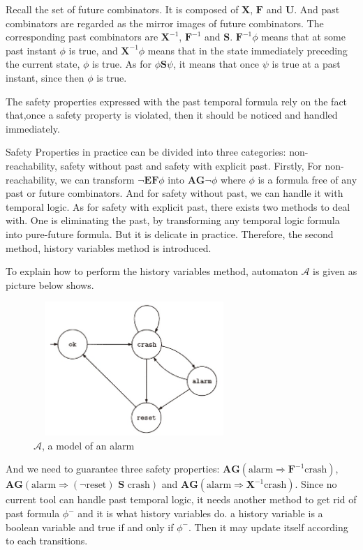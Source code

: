 \documentclass[10pt, conference]{IEEEtran}
\begin{document}
        Recall the set of future combinators. It is composed of $\textbf{X}$, $\textbf{F}$ and $\textbf{U}$. And past combinators are regarded as the mirror images of future combinators. The corresponding past combinators are $\textbf{X}^{-1}{}$, $\textbf{F}^{-1}$ and $\textbf{S}$. $\textbf{F}^{-1}\phi$ means that at some past instant $\phi$ is true, and $\textbf{X}^{-1}\phi$ means that in the state immediately preceding the current state, $\phi$ is true. As for $\phi\textbf{S}\psi$, it means that once
        $\psi$ is true at a past instant, since then $\phi$ is true.

        The safety properties expressed with the past temporal formula rely on the fact that,once a safety property is violated, then it should be noticed and handled immediately.

        Safety Properties in practice can be divided into three categories: non-reachability, safety without past and safety with explicit past. Firstly, For non-reachability, we can transform $\neg\textbf{EF}\phi$ into $\textbf{AG}\neg\phi$ where $\phi$ is a formula free of any past or future combinators. And for safety without past, we can handle it with temporal logic. As for safety with explicit past, there exists two methods to deal with. One is eliminating the past, by transforming any temporal logic formula into pure-future formula. But it is delicate in practice. Therefore, the second method, history variables method is introduced. 
        
        To explain how to perform the history variables method, automaton $\mathcal{A}$ is given as picture below shows.
        \begin{figure}[H]
            \centering
            \includegraphics[width=3.0in, height=2.0in]{7_1.jpg}
            \caption{$\mathcal{A}$, a model of an alarm}
        \end{figure}
        And we need to guarantee three safety properties: $\textbf{AG}(\text{alarm}\Rightarrow\textbf{F}^{-1}\text{crash})$, $\textbf{AG}(\text{alarm}\Rightarrow(\neg\text{reset})\textbf{ S }\text{crash})$ and $\textbf{AG}(\text{alarm}\Rightarrow\textbf{X}^{-1}\text{crash})$. Since no current tool can handle past temporal logic, it needs another method to get rid of past formula $\phi^-$ and it is what history variables do. a history variable is a boolean variable and true if and only if $\phi^-$. Then it may update itself according to each transitions.
        
\end{document}
